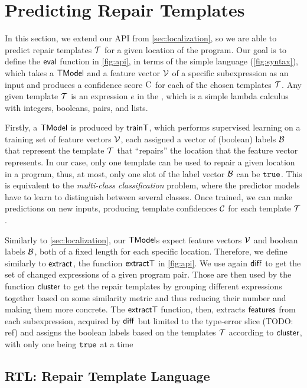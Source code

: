\section{Predicting Repair Templates}
\label{sec:templ-pred}

In this section, we extend our API from \autoref{sec:localization}, so we are
able to predict repair templates $\mathcal{T}$ for a given location of the program. Our
goal is to define the $\mathsf{eval}$ function in \autoref{fig:api}, in terms of the
simple language \repairLang (\autoref{fig:syntax}), which takes a $\mathsf{TModel}$ and
a feature vector $\mathcal{V}$ of a specific subexpression as an input and produces a
confidence score $\textsc{C}$ for each of the chosen templates $\mathcal{T}$. Any given template
$\mathcal{T}$ is an expression $e$ in the \repairLang, which is a simple lambda calculus
with integers, booleans, pairs, and lists.

Firstly, a $\mathsf{TModel}$ is produced by $\mathsf{trainT}$, which performs supervised
learning on a training set of feature vectors $\mathcal{V}$, each assigned a vector of
(boolean) labels $\mathcal{B}$ that represent the template $\mathcal{T}$ that ``repairs'' the
location that the feature vector represents. In our case, only one template can
be used to repair a given location in a program, thus, at most, only one slot of
the label vector $\mathcal{B}$ can be $\mathtt{true}$. This is equivalent to the
\emph{multi-class classification} problem, where the predictor models have to
learn to distinguish between several classes. Once trained, we can make
predictions on new inputs, producing template confidences $\mathcal{C}$ for each
template $\mathcal{T}$.

Similarly to \autoref{sec:localization}, our $\mathsf{TModel}$s expect feature vectors
$\mathcal{V}$ and boolean labels $\mathcal{B}$, both of a fixed length for each specific location.
Therefore, we define similarly to $\mathsf{extract}$, the function $\mathsf{extractT}$ in
\autoref{fig:api}. We use again $\mathsf{diff}$ to get the set of changed expressions
of a given program pair. Those are then used by the function $\mathsf{cluster}$ to
get the repair templates by grouping different expressions together based on
some similarity metric and thus reducing their number and making them more
concrete. The $\mathsf{extractT}$ function, then, extracts $\mathsf{features}$ from each
subexpression, acquired by $\mathsf{diff}$ but limited to the type-error slice (TODO:
ref) and assigns the boolean labels based on the templates $\mathcal{T}$ according to
$\mathsf{cluster}$, with only one being $\mathtt{true}$ at a time


\subsection{RTL: Repair Template Language}
\label{subsec:lang}

